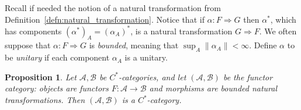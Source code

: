 \documentclass[a4paper,11pt]{article}
\theoremstyle{plain}
\newtheorem{proposition}{Proposition}[section]
\theoremstyle{remark}
\newcommand{\mc}[1]{\mathcal{#1}}
\begin{document}
Recall if needed the notion of a natural transformation from Definition~\ref{defn:natural_transformation}.  Notice that if $\alpha\colon F\Rightarrow G$ then $\alpha^*$, which has components $(\alpha^*)_A = (\alpha_A)^*$, is a natural transformation $G\Rightarrow F$.  We often suppose that $\alpha \colon F \Rightarrow G$ is \emph{bounded}, meaning that $\sup_A \|\alpha_A\| < \infty$.  Define $\alpha$ to be \emph{unitary} if each component $\alpha_A$ is a unitary.

\begin{proposition}\label{prop:functor_cat}
Let $\mc A, \mc B$ be $C^*$-categories, and let $(\mc A, \mc B)$ be the functor category: objects are functors $F\colon \mc A \to \mc B$ and morphisms are bounded natural transformations.  Then $(\mc A, \mc B)$ is a $C^*$-category.
\end{proposition}
\end{document}
